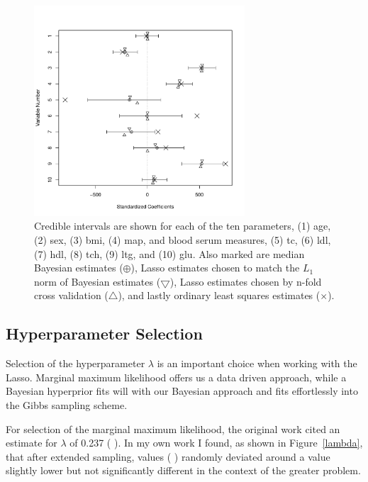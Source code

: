 \documentclass{uwstat572}
\newcommand{\vmcomment}[1]{({\color{blue}{VM's comment:}} \textbf{\color{blue}{#1}})}
\begin{document}
\begin{figure}\label{CIs}
  \centering
    \includegraphics[width=0.7\textwidth]{SaveFigure2.pdf}
  \caption{Credible intervals are shown for each of the ten parameters, (1) age, (2) sex, (3) bmi, (4) map, and blood serum measures, (5) tc, (6) ldl, (7) hdl, (8) tch, (9) ltg, and (10) glu. Also marked are median Bayesian estimates ($\oplus$), Lasso estimates chosen to match the $L_1$ norm of Bayesian estimates ($\bigtriangledown$), Lasso estimates chosen by n-fold cross validation ($\bigtriangleup$), and lastly ordinary least squares estimates ($\times$).}
\end{figure}

\subsection{Hyperparameter Selection}
Selection of the hyperparameter $\lambda$ is an important choice when working with the Lasso. Marginal maximum likelihood offers us a data driven approach, while a Bayesian hyperprior fits will with our Bayesian approach and fits effortlessly into the Gibbs sampling scheme.

For selection of the marginal maximum likelihood, the original work cited an estimate for $\lambda$ of 0.237 \vmcomment{I don't understand what ``selection of the marginal maximum likelihood''.}. 
In my own work I found, as shown in Figure~\ref{lambda}, that after extended sampling, values \vmcomment{values of what?} randomly deviated around a value slightly lower but not significantly different in the context of the greater problem.
\end{document}
